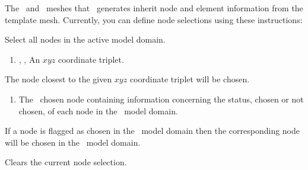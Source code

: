 The \swf\ and \gwf\ meshes that \mut\ generates inherit node and element information from the template mesh.  Currently, you can define node selections using these instructions: \label{page:nodeSelect}

    {Select all nodes in the active model domain.
     }

    {
        \squish
        \begin{enumerate}
        \item {}, ,   An $xyz$ coordinate triplet.
        \end{enumerate}
        The node closest to the given $xyz$ coordinate triplet will be chosen.
    }

    {
        \squish
        \begin{enumerate}
        \item {}  The \gb\ chosen node  containing information concerning the status, chosen or not chosen, of each node in the \gb\ model domain.
        \end{enumerate}
          If a node is flagged as chosen in the \gb\ model domain then the corresponding node will be chosen in the \mfus\ model domain.
    }

    {Clears the current node selection.
     }



